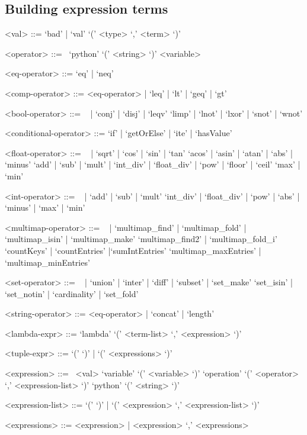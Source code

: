 \subsection{Building expression terms}
\begin{grammar}

<val> ::= `bad' | `val' `(' <type> `,' <term> `)'

<operator> ::=
~\alt `python' `(' <string> `)'
\alt <variable>

<eq-operator> ::= `eq' | `neq'

<comp-operator> ::= <eq-operator> | `leq' | `lt' | `geq' | `gt'

<bool-operator> ::=
~ | `conj' | `disj' | `leqv'
\alt `limp' | `lnot' | `lxor' | `snot' | `wnot'

<conditional-operator> ::= `if' | `getOrElse' | `ite' | `hasValue'

<float-operator> ::=
~ | `sqrt' | `cos' | `sin' | `tan'
\alt `acos' | `asin' | `atan' | `abs' | `minus'
\alt `add' | `sub' | `mult' | `int_div' | `float_div' | `pow' | `floor' | `ceil'
\alt `max' | `min'

<int-operator> ::=
~ | `add' | `sub' | `mult'
\alt `int_div' | `float_div' | `pow' | `abs' | `minus' | `max' | `min'

<multimap-operator> ::=
~ | `multimap_find' | `multimap_fold' | `multimap_isin' | `multimap_make'
\alt `multimap_find2' | `multimap_fold_i'
\alt `countKeys' | `countEntries' |`sumIntEntries'
\alt `multimap_maxEntries' | `multimap_minEntries'

<set-operator> ::=
~ | `union' | `inter' | `diff' | `subset' | `set_make'
\alt `set_isin' | `set_notin' | `cardinality' | `set_fold'

<string-operator> ::= <eq-operator> | `concat' | `length'

<lambda-expr> ::= `lambda' `(' <term-list> `,' <expression> `)'

<tuple-expr> ::= `(' `)' | `(' <expressions> `)'

<expression> ::=
~\alt <val>
\alt `variable' `(' <variable> `)'
\alt `operation' `(' <operator> `,' <expression-list> `)'
\alt `python' `(' <string> `)'

<expression-list> ::= `(' `)' | `(' <expression> `,' <expression-list> `)'

<expressions> ::= <expression> | <expression> `,' <expressions>

\end{grammar}


